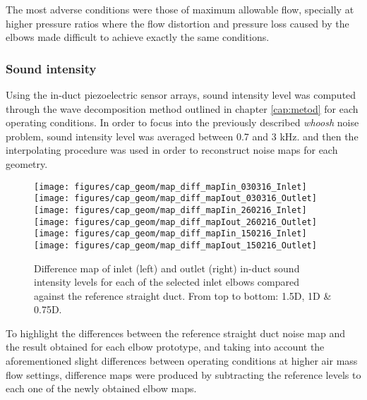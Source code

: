 The most adverse conditions were those of maximum allowable flow, specially at higher pressure ratios where the flow distortion and pressure loss caused by the elbows made difficult to achieve exactly the same conditions.

\subsubsection{Sound intensity}

Using the in-duct piezoelectric sensor arrays, sound intensity level was computed through the wave decomposition method outlined in chapter \ref{cap:metod} for each operating conditions. In order to focus into the previously described \emph{whoosh} noise problem, sound intensity level was averaged between 0.7 and 3 kHz. and then the interpolating procedure was used in order to reconstruct noise maps for each geometry.

\begin{figure}[thb!]
\centering

\texttt{[image: figures/cap\_geom/map\_diff\_mapIin\_030316\_Inlet]}\hspace{4mm}
\texttt{[image: figures/cap\_geom/map\_diff\_mapIout\_030316\_Outlet]}\\[4mm]

\texttt{[image: figures/cap\_geom/map\_diff\_mapIin\_260216\_Inlet]}\hspace{4mm}
\texttt{[image: figures/cap\_geom/map\_diff\_mapIout\_260216\_Outlet]}\\[4mm]

\texttt{[image: figures/cap\_geom/map\_diff\_mapIin\_150216\_Inlet]}\hspace{4mm}
\texttt{[image: figures/cap\_geom/map\_diff\_mapIout\_150216\_Outlet]}\\[4mm]

\caption[Difference maps for SIL]{Difference map of inlet (left) and outlet (right) in-duct sound intensity levels for each of the selected inlet elbows compared against the reference straight duct. From top to bottom: 1.5D, 1D \& 0.75D.}
\label{fig:map_diff_in_out}
\end{figure}

To highlight the differences between the reference straight duct noise map and the result obtained for each elbow prototype, and taking into account the aforementioned slight differences between operating conditions at higher air mass flow settings, difference maps were produced by subtracting the reference levels to each one of the newly obtained elbow maps.

